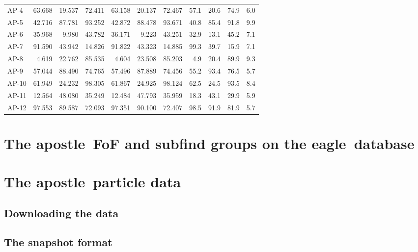 \documentclass[10pt, a4paper]{article}
\newcommand{\eagle}{{\sc eagle}}
\newcommand{\apostle}{{\sc apostle}}
\begin{document}
\begin{table}
\begin {tabular}{lrrrrrrrrrr}
AP-4  & 63.668    & 19.537   &	72.411  &   63.158 &  20.137   &  72.467 &  57.1   &	20.6	& 74.9	  & 6.0     \\
AP-5  & 42.716	  & 87.781   &	93.252  &   42.872 &  88.478   &  93.671 &  40.8   &	85.4    & 91.8    & 9.9     \\
AP-6  & 35.968    & 9.980    &	43.782  &   36.171 &   9.223   &  43.251 &  32.9   &	13.1    & 45.2    & 7.1    \\
AP-7  & 91.590    & 43.942   &	14.826  &   91.822 &  43.323   &  14.885 &  99.3   &	39.7    & 15.9    & 7.1   \\
AP-8  &  4.619    & 22.762   &  85.535  &   4.604  &  23.508   &  85.203 &  4.9    &	20.4    & 89.9    & 9.3   \\
AP-9  &  57.044   & 88.490   &	74.765  &  57.496  &  87.889   & 74.456  &  55.2   &	93.4    & 76.5	  & 5.7   \\
AP-10 & 61.949    & 24.232   &	98.305  &  61.867  & 24.925    & 98.124  &  62.5   & 	24.5    & 93.5    & 8.4   \\
AP-11 &  12.564   & 48.080   &	35.249  &  12.484  & 47.793    & 35.959  &  18.3   &	43.1	& 29.9    &5.9    \\
AP-12 &  97.553   & 89.587   &	72.093  &   97.351 & 90.100    & 72.407  &  98.5   &	91.9    & 81.9    & 5.7   \\
\hline
\end{tabular}
\label{TabIC}
\end{table}

\section{The \apostle\ FoF and subfind groups on the \eagle\ database}

\section{The \apostle\ particle data}
\label{SecEaglePData}

\subsection{Downloading the data}

\subsection{The snapshot format}
\end{document}
